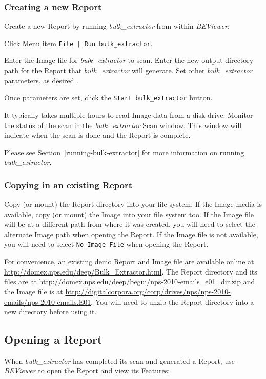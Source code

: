 \documentclass[10pt,twoside]{article}
\newcommand{\bulk}{\emph{bulk\_extractor}\xspace}
\newcommand{\bev}{\emph{BEViewer}\xspace}
\begin{document}
\subsubsection{Creating a new Report}
Create a new Report by running \bulk from within \bev:
\begin{compactenum}
\item Click Menu item \texttt{File | Run bulk\_extractor}.
\item Enter the Image file for \bulk to scan.
Enter the new output directory path for the Report that \bulk will generate.
Set other \bulk parameters, as desired \cite{garfinkel:bulk-extractor}.
\item Once parameters are set, click the \texttt{Start bulk\_extractor} button.
\item It typically takes multiple hours to read Image data from a disk drive.
Monitor the status of the scan in the \bulk Scan window.
This window will indicate when the scan is done and the Report is complete.
\end{compactenum}
Please see Section~\ref{running-bulk-extractor} for more information on running \bulk.

\subsubsection{Copying in an existing Report}
Copy (or mount) the Report directory into your file system.
If the Image media is available,
copy (or mount) the Image into your file system too.
If the Image file will be at a different path from where it was created,
you will need to select the alternate Image path when opening the Report.
If the Image file is not available,
you will need to select \texttt{No Image File} when opening the Report.

For convenience, an existing demo Report and Image file are available
online at \url{http://domex.nps.edu/deep/Bulk\_Extractor.html}.
The Report directory and its files
are at \url{http://domex.nps.edu/deep/begui/nps-2010-emails\_e01\_dir.zip}
and the Image file
is at \url{http://digitalcorpora.org/corp/drives/nps/nps-2010-emails/nps-2010-emails.E01}.
You will need to unzip the Report directory into a new directory before using it.

\subsection{Opening a Report}
When \bulk has completed its scan and generated a Report,
use \bev to open the Report and view its Features:
\end{document}

